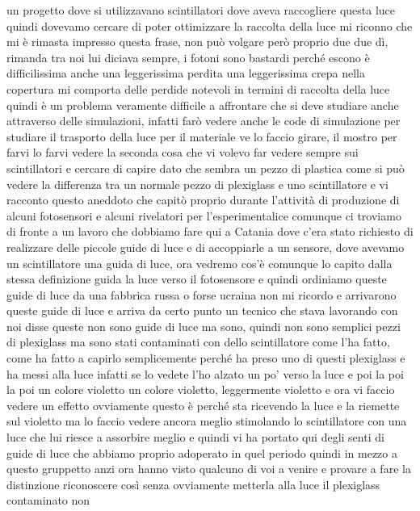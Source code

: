 un progetto dove si utilizzavano scintillatori dove aveva raccogliere questa luce quindi dovevamo cercare di poter ottimizzare la raccolta della luce mi riconno che mi è rimasta impresso questa frase, non può volgare però proprio due due dì, rimanda tra noi lui diciava sempre, i fotoni sono bastardi perché escono è difficilissima anche una leggerissima perdita una leggerissima crepa nella copertura mi comporta delle perdide notevoli in termini di raccolta della luce quindi è un problema veramente difficile a affrontare che si deve studiare anche attraverso delle simulazioni, infatti farò vedere anche le code di simulazione per studiare il trasporto della luce per il materiale ve lo faccio girare, il mostro per farvi lo farvi vedere la seconda cosa che vi volevo far vedere sempre sui scintillatori e cercare di capire dato che sembra un pezzo di plastica come si può vedere la differenza tra un normale pezzo di plexiglass e uno scintillatore e vi racconto questo aneddoto che capitò proprio durante l'attività di produzione di alcuni fotosensori e alcuni rivelatori per l'esperimentalice comunque ci troviamo di fronte a un lavoro che dobbiamo fare qui a Catania dove c'era stato richiesto di realizzare delle piccole guide di luce e di accoppiarle a un sensore, dove avevamo un scintillatore una guida di luce, ora vedremo cos'è comunque lo capito dalla stessa definizione guida la luce verso il fotosensore e quindi ordiniamo queste guide di luce da una fabbrica russa o forse ucraina non mi ricordo e arrivarono queste guide di luce e arriva da certo punto un tecnico che stava lavorando con noi disse queste non sono guide di luce ma sono, quindi non sono semplici pezzi di plexiglass ma sono stati contaminati con dello scintillatore come l'ha fatto, come ha fatto a capirlo semplicemente perché ha preso uno di questi plexiglass e ha messi alla luce infatti se lo vedete l'ho alzato un po' verso la luce e poi la poi la poi un colore violetto un colore violetto, leggermente violetto e ora vi faccio vedere un effetto ovviamente questo è perché sta ricevendo la luce e la riemette sul violetto ma lo faccio vedere ancora meglio stimolando lo scintillatore con una luce che lui riesce a assorbire meglio e quindi vi ha portato qui degli senti di guide di luce che abbiamo proprio adoperato in quel periodo quindi in mezzo a questo gruppetto anzi ora hanno visto qualcuno di voi a venire e provare a fare la distinzione riconoscere così senza ovviamente metterla alla luce il plexiglass contaminato non

